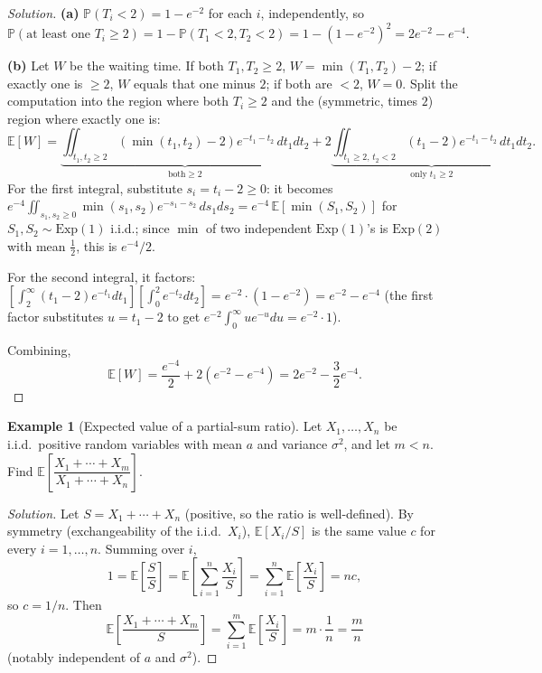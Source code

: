 \documentclass[11pt]{article}
\theoremstyle{definition}
\newtheorem{example}{Example}[section]
\newcommand{\E}{\mathbb{E}}
\begin{document}
\begin{proof}[Solution]
\textbf{(a)} $\mathbb P(T_i<2)=1-e^{-2}$ for each $i$, independently, so
\[
\mathbb P(\text{at least one } T_i\ge2) = 1-\mathbb P(T_1<2,T_2<2) = 1-(1-e^{-2})^2 = \boxed{2e^{-2}-e^{-4}}.
\]

\textbf{(b)} Let $W$ be the waiting time. If both $T_1,T_2\ge2$, $W=\min(T_1,T_2)-2$; if exactly one is $\ge2$, $W$ equals that one minus $2$; if both are $<2$, $W=0$. Split the computation into the region where both $T_i\ge2$ and the (symmetric, times $2$) region where exactly one is:
\[
\E[W] = \underbrace{\iint_{t_1,t_2\ge2}(\min(t_1,t_2)-2)e^{-t_1-t_2}\,dt_1dt_2}_{\text{both} \ge 2} + 2\underbrace{\iint_{t_1\ge2,\,t_2<2}(t_1-2)e^{-t_1-t_2}\,dt_1dt_2}_{\text{only } t_1\ge 2}.
\]
For the first integral, substitute $s_i=t_i-2\ge0$: it becomes $e^{-4}\iint_{s_1,s_2\ge0}\min(s_1,s_2)e^{-s_1-s_2}\,ds_1ds_2 = e^{-4}\,\E[\min(S_1,S_2)]$ for $S_1,S_2\sim\mathrm{Exp}(1)$ i.i.d.; since $\min$ of two independent $\mathrm{Exp}(1)$'s is $\mathrm{Exp}(2)$ with mean $\tfrac12$, this is $e^{-4}/2$.

For the second integral, it factors: $\left[\int_2^\infty(t_1-2)e^{-t_1}dt_1\right]\left[\int_0^2e^{-t_2}dt_2\right] = e^{-2}\cdot(1-e^{-2}) = e^{-2}-e^{-4}$ (the first factor substitutes $u=t_1-2$ to get $e^{-2}\int_0^\infty ue^{-u}du=e^{-2}\cdot1$).

Combining,
\[
\E[W] = \frac{e^{-4}}2 + 2(e^{-2}-e^{-4}) = \boxed{2e^{-2}-\frac32e^{-4}}.
\]
\end{proof}

\begin{example}[Expected value of a partial-sum ratio]
Let $X_1,\dots,X_n$ be i.i.d.\ positive random variables with mean $a$ and variance $\sigma^2$, and let $m<n$. Find $\E\!\left[\dfrac{X_1+\cdots+X_m}{X_1+\cdots+X_n}\right]$.
\end{example}

\begin{proof}[Solution]
Let $S=X_1+\cdots+X_n$ (positive, so the ratio is well-defined). By symmetry (exchangeability of the i.i.d.\ $X_i$), $\E[X_i/S]$ is the same value $c$ for every $i=1,\dots,n$. Summing over $i$,
\[
1 = \E\!\left[\frac SS\right] = \E\!\left[\sum_{i=1}^n \frac{X_i}{S}\right] = \sum_{i=1}^n \E\!\left[\frac{X_i}{S}\right] = nc,
\]
so $c=1/n$. Then
\[
\E\!\left[\frac{X_1+\cdots+X_m}{S}\right] = \sum_{i=1}^m \E\!\left[\frac{X_i}{S}\right] = m\cdot\frac1n = \boxed{\frac mn}
\]
(notably independent of $a$ and $\sigma^2$).
\end{proof}
\end{document}
